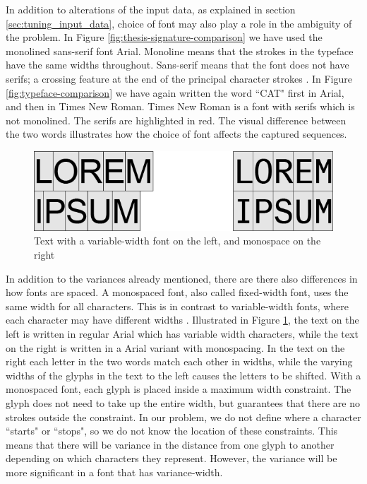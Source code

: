 In addition to alterations of the input data, as explained in section \ref{sec:tuning_input_data}, choice of font may also play a role in the ambiguity of the problem. In Figure \ref{fig:thesis-signature-comparison} we have used the monolined sans-serif font Arial. Monoline means that the strokes in the typeface have the same widths throughout. Sans-serif means that the font does not have serifs; a crossing feature at the end of the principal character strokes \citep{felici2011complete}. In Figure \ref{fig:typeface-comparison} we have again written the word ``CAT" first in Arial, and then in Times New Roman. Times New Roman is a font with serifs which is not monolined. The serifs are highlighted in red. The visual difference between the two words illustrates how the choice of font affects the captured sequences.

\begin{figure}[ht]
    \centering
    \includegraphics[width=1.0\textwidth]{fig/chapter2/regular_mono_comparison.png}
    \caption{Text with a variable-width font on the left, and monospace on the right}
    \label{fig:regular-mono-comparison}
\end{figure}

In addition to the variances already mentioned, there are there also differences in how fonts are spaced. A monospaced font, also called fixed-width font, uses the same width for all characters. This is in contrast to variable-width fonts, where each character may have different widths \citep{felici2011complete}. Illustrated in Figure \ref{fig:regular-mono-comparison}, the text on the left is written in regular Arial which has variable width characters, while the text on the right is written in a Arial variant with monospacing. In the text on the right each letter in the two words match each other in widths, while the varying widths of the glyphs in the text to the left causes the letters to be shifted. With a monospaced font, each glyph is placed inside a maximum width constraint. The glyph does not need to take up the entire width, but guarantees that there are no strokes outside the constraint. In our problem, we do not define where a character ``starts" or ``stops", so we do not know the location of these constraints. This means that there will be variance in the distance from one glyph to another depending on which characters they represent. However, the variance will be more significant in a font that has variance-width. 


